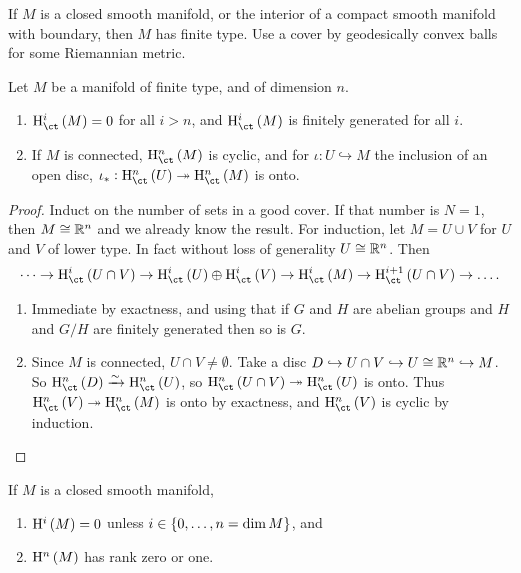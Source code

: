 \begin{fact*}
If $ M $ is a closed smooth manifold, or the interior of a compact smooth manifold with boundary, then $ M $ has finite type. Use a cover by geodesically convex balls for some Riemannian metric.
\end{fact*}

\begin{proposition}
Let $ M $ be a manifold of finite type, and of dimension $ n $.
\begin{enumerate}
\item $ \Hc^i\br{M} = 0 $ for all $ i > n $, and $ \Hc^i\br{M} $ is finitely generated for all $ i $.
\item If $ M $ is connected, $ \Hc^n\br{M} $ is cyclic, and for $ \iota : U \hookrightarrow M $ the inclusion of an open disc, $ \iota_* : \Hc^n\br{U} \twoheadrightarrow \Hc^n\br{M} $ is onto.
\end{enumerate}
\end{proposition}

\begin{proof}
Induct on the number of sets in a good cover. If that number is $ N = 1 $, then $ M \cong \mathbb{R}^n $ and we already know the result. For induction, let $ M = U \cup V $ for $ U $ and $ V $ of lower type. In fact without loss of generality $ U \cong \mathbb{R}^n $. Then
$$ \dots \to \Hc^i\br{U \cap V} \to \Hc^i\br{U} \oplus \Hc^i\br{V} \to \Hc^i\br{M} \to \Hc^{i + 1}\br{U \cap V} \to \dots. $$
\begin{enumerate}
\item Immediate by exactness, and using that if $ G $ and $ H $ are abelian groups and $ H $ and $ G / H $ are finitely generated then so is $ G $.
\item Since $ M $ is connected, $ U \cap V \ne \emptyset $. Take a disc $ D \hookrightarrow U \cap V \hookrightarrow U \cong \mathbb{R}^n \hookrightarrow M $. So $ \Hc^n\br{D} \xrightarrow{\sim} \Hc^n\br{U} $, so $ \Hc^n\br{U \cap V} \twoheadrightarrow \Hc^n\br{U} $ is onto. Thus $ \Hc^n\br{V} \twoheadrightarrow \Hc^n\br{M} $ is onto by exactness, and $ \Hc^n\br{V} $ is cyclic by induction.
\end{enumerate}
\end{proof}

\pagebreak

\begin{corollary}
If $ M $ is a closed smooth manifold,
\begin{enumerate}
\item $ \H^i\br{M} = 0 $ unless $ i \in \cbr{0, \dots, n = \dim M} $, and
\item $ \H^n\br{M} $ has rank zero or one.
\end{enumerate}
\end{corollary}

